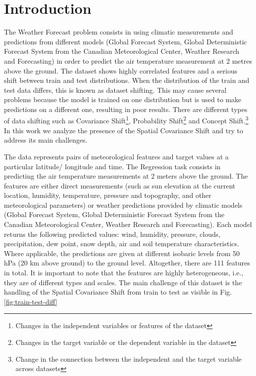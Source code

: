 \documentclass{article}
\begin{document}
	
	
\section{Introduction}
    The Weather Forecast problem consists in using climatic measurements and predictions from different models (Global Forecast System, Global Deterministic Forecast System from the Canadian Meteorological Center, Weather Research and Forecasting) in order to predict the air temperature measurement at 2 metres above the ground. The dataset shows highly correlated features and a serious shift between train and test distributions.
    When the distribution of the train and test data differs, this is known as dataset shifting. This may cause several problems because the model is trained on one distribution but is used to make predictions on a different one, resulting in poor results. There are different types of data shifting such as 
    Covariance Shift\footnote{Changes in the independent variables or features of the dataset},
    Probability Shift\footnote{Changes in the target variable or the dependent variable in the dataset}
    and Concept Shift.\footnote{Change in the connection between the independent and the target variable across datasets}
    In this work we analyze the presence of the Spatial Covariance Shift and try to address its main challenges.

    The data represents pairs of meteorological features and target values at a particular latitude/ longitude and time. The Regression task consists in predicting the air temperature measurements at 2 meters above the ground.
    The features are either direct measurements (such as sun elevation at the current location, humidity, temperature, pressure and topography, and other meteorological parameters) or weather predictions provided by climatic models (Global Forecast System, Global Deterministic Forecast System from the Canadian Meteorological Center, Weather Research and Forecasting).
    Each model returns the following predicted values: wind, humidity, pressure, clouds, precipitation, dew point, snow depth, air and soil temperature characteristics. Where applicable, the predictions are given at different isobaric levels from 50 hPa (20 km above ground) to the ground level.
    Altogether, there are 111 features in total. It is important to note that the features are highly heterogeneous, i.e., they are of different types and scales.
    The main challenge of this dataset is the handling of the Spatial Covariance Shift from train to test as visible in Fig. \ref{fig:train-test-diff}
\end{document}
